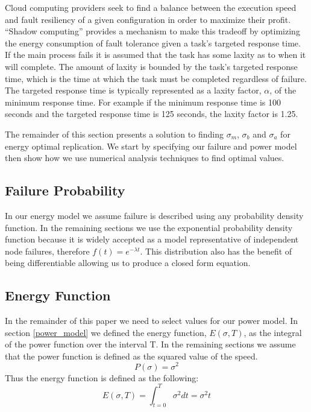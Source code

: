 Cloud computing providers seek to find a balance between the execution
speed and fault resiliency of a given configuration in order to
maximize their profit. ``Shadow computing'' provides a mechanism to
make this tradeoff by optimizing the energy consumption of fault
tolerance given a task's targeted response time. If the main process
fails it is assumed that the task has some laxity as to when it will
complete. The amount of laxity is bounded by the task's targeted
response time, which is the time at which the task must be completed
regardless of failure. The targeted response time is typically
represented as a laxity factor, $\alpha$, of the minimum response
time. For example if the minimum response time is 100 seconds and the
targeted response time is 125 seconds, the laxity factor is 1.25.

The remainder of this section presents a solution to finding
$\sigma_m$, $\sigma_b$ and $\sigma_a$ for energy optimal
replication. We start by specifying our failure and power model then
show how we use numerical analysis techniques to find optimal values.

\subsection{Failure Probability}

In our energy model we assume failure is described using any
probability density function. In the remaining sections we use the
exponential probability density function because it is widely accepted
as a model representative of independent node failures, therefore
$f(t)=e^{-\lambda t}$. This distribution also has the benefit of being
differentiable allowing us to produce a closed form equation.

\subsection{Energy Function}

In the remainder of this paper we need to select values for our power
model. In section \ref{power_model} we defined the energy function,
$E(\sigma, T)$, as the integral of the power function over the
interval T. In the remaining sections we assume that the power
function is defined as the squared value of the speed.
\begin{equation}
P(\sigma)=\sigma^2
\end{equation}
Thus the energy function is defined as the following:
\begin{equation}
E(\sigma,T)=\int_{t=0}^T \sigma^2 dt = \sigma^2t
\end{equation}

